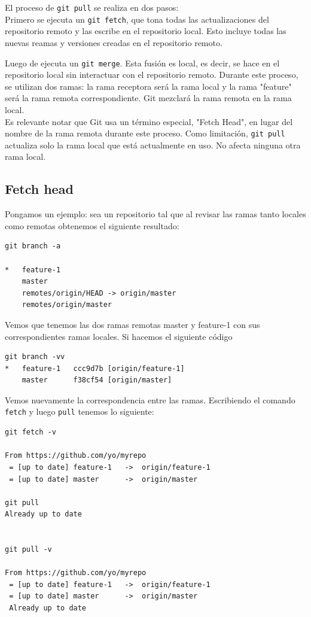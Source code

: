 El proceso de \texttt{git pull} se realiza en dos pasos:\\
Primero se ejecuta un \texttt{git fetch}, que tona todas las actualizaciones del repositorio remoto y las escribe en el repositorio local. Esto incluye todas las nuevas reamas y versiones creadas en el repositorio remoto.

Luego de ejecuta un \texttt{git merge}. Esta fusión es local, es decir, se hace en el repositorio local sin interactuar con el repositorio remoto. Durante este proceso, se utilizan dos ramas: la rama receptora será la rama local y la rama "feature" será la rama remota correspondiente. Git mezclará la rama remota en la rama local. \\
Es relevante notar que Git usa un término especial, "Fetch Head", en lugar del nombre de la rama remota durante este proceso. Como limitación, \texttt{git pull} actualiza solo la rama local que está actualmente en uso. No afecta ninguna otra rama local.


\subsection{Fetch head}

Pongamos un ejemplo: sea un repositorio tal que al revisar las ramas tanto locales como remotas obtenemos el siguiente resultado:

\begin{verbatim}
git branch -a

*   feature-1
    master
    remotes/origin/HEAD -> origin/master
    remotes/origin/master
\end{verbatim}

Vemos que tenemos las dos ramas remotas master y feature-1 con sus correspondientes ramas locales. Si hacemos el siguiente código

\begin{verbatim}
git branch -vv
*   feature-1   ccc9d7b [origin/feature-1] 
    master      f38cf54 [origin/master]
\end{verbatim}

Vemos nuevamente la correspondencia entre las ramas. Escribiendo el comando \texttt{fetch} y luego \texttt{pull} tenemos lo siguiente:

\begin{verbatim}
git fetch -v

From https://github.com/yo/myrepo
 = [up to date] feature-1   ->  origin/feature-1
 = [up to date] master      ->  origin/master

git pull
Already up to date

 
git pull -v
 
From https://github.com/yo/myrepo
 = [up to date] feature-1   ->  origin/feature-1
 = [up to date] master      ->  origin/master 
 Already up to date
 \end{verbatim}

